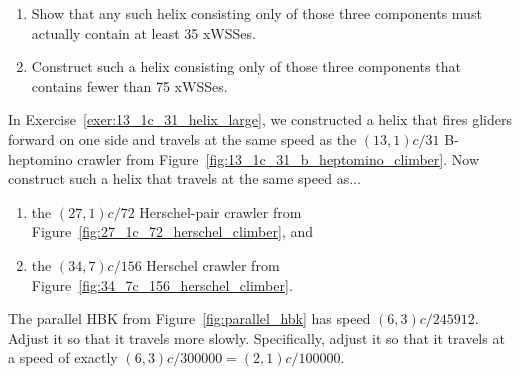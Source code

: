 \begin{multicols}{2}
\begin{problemstar}
\begin{enumerate}[label=\bf\color{ocre}(\alph*)]
		
		
		\item Show that any such helix consisting only of those three components must actually contain at least 35 xWSSes.
		
		\item Construct such a helix consisting only of those three components that contains fewer than 75 xWSSes.
	\end{enumerate}
\end{problemstar}


\mfilbreak


\begin{problem}\label{exer:construct_oblique_helix_for_crawlers} 
	In Exercise~\ref{exer:13_1c_31_helix_large}, we constructed a helix that fires gliders forward on one side and travels at the same speed as the $(13,1)c/31$ B-heptomino crawler from Figure~\ref{fig:13_1c_31_b_heptomino_climber}. Now construct such a helix that travels at the same speed as...\smallskip
	
	\begin{enumerate}[label=\bf\color{ocre}(\alph*)]
		\item the $(27,1)c/72$ Herschel-pair crawler from Figure~\ref{fig:27_1c_72_herschel_climber}, and
		
		\item the $(34,7)c/156$ Herschel crawler from Figure~\ref{fig:34_7c_156_herschel_climber}.
	\end{enumerate}
\end{problem}


\mfilbreak


\begin{problem}\label{exer:parallel_hbk_make_slower} 
	The parallel HBK from Figure~\ref{fig:parallel_hbk} has speed $(6,3)c/245912$. Adjust it so that it travels more slowly. Specifically, adjust it so that it travels at a speed of exactly $(6,3)c/300000 = (2,1)c/100000$.
\end{problem}



\end{multicols}
